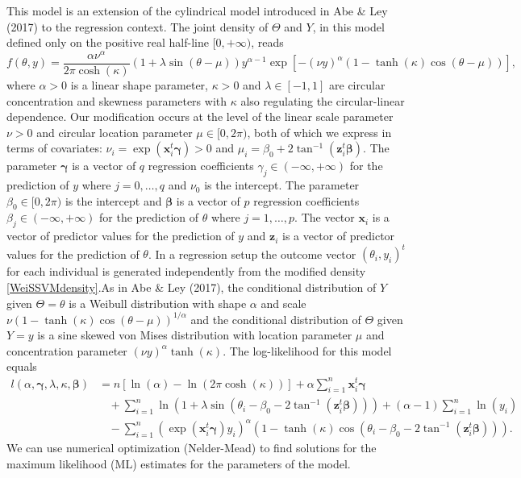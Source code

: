 \documentclass[12pt,]{article}
\begin{document}
This model is an extension of the cylindrical model introduced in Abe \&
Ley (2017) to the regression context. The joint density of \(\Theta\)
and \(Y\), in this model defined only on the positive real half-line
\([0, + \infty)\), reads \begin{equation}\label{WeiSSVMdensity}
f(\theta, y) = \frac{\alpha\nu^\alpha}{2\pi\cosh(\kappa)}
                 (1 +\lambda\sin(\theta - \mu))
                 y^{\alpha-1}
                 \exp[-(\nu y)^{\alpha}(1-\tanh(\kappa)\cos(\theta - \mu))],
\end{equation} \noindent where \(\alpha > 0\) is a linear shape
parameter, \(\kappa > 0\) and \(\lambda \in [-1, 1]\) are circular
concentration and skewness parameters with \(\kappa\) also regulating
the circular-linear dependence. Our modification occurs at the level of
the linear scale parameter \(\nu>0\) and circular location parameter
\(\mu\in [0, 2\pi)\), both of which we express in terms of covariates:
\(\nu_i = \exp(\boldsymbol{x}_i^t\boldsymbol{\gamma}) > 0\) and
\(\mu_i = \beta_0 + 2\tan^{-1}(\boldsymbol{z}_i^t\boldsymbol{\beta})\).
The parameter \(\boldsymbol{\gamma}\) is a vector of \(q\) regression
coefficients \(\gamma_j \in (-\infty, +\infty)\) for the prediction of
\(y\) where \(j = 0, \dots, q\) and \(\nu_0\) is the intercept. The
parameter \(\beta_0 \in [0, 2\pi)\) is the intercept and
\(\boldsymbol{\beta}\) is a vector of \(p\) regression coefficients
\(\beta_j \in (-\infty, +\infty)\) for the prediction of \(\theta\)
where \(j = 1, \dots, p\). The vector \(\boldsymbol{x}_i\) is a vector
of predictor values for the prediction of \(y\) and \(\boldsymbol{z}_i\)
is a vector of predictor values for the prediction of \(\theta\). In a
regression setup the outcome vector \((\theta_i, y_i)^t\) for each
individual is generated independently from the modified density
\eqref{WeiSSVMdensity}.\newline \indent As in Abe \& Ley (2017), the
conditional distribution of \(Y\) given \(\Theta=\theta\) is a Weibull
distribution with shape \(\alpha\) and scale
\(\nu(1-\tanh(\kappa)\cos(\theta - \mu))^{1/\alpha}\) and the
conditional distribution of \(\Theta\) given \(Y=y\) is a sine skewed
von Mises distribution with location parameter \(\mu\) and concentration
parameter \((\nu y)^\alpha\tanh(\kappa)\). The log-likelihood for this
model equals \begin{align}\label{WeiSSVMLikelihood}
l(\alpha, \boldsymbol{\gamma}, \lambda, \kappa, \boldsymbol{\beta}) 
   &= n[\ln(\alpha) - \ln(2\pi\cosh(\kappa))] + \alpha \sum^{n}_{i = 1} \boldsymbol{x}_i^t\boldsymbol{\gamma} \nonumber\\
   &\:\:\:\:+\sum^{n}_{i = 1} \ln(1 +\lambda\sin(\theta_i - \beta_0 - 2\tan^{-1}(\boldsymbol{z}_i^t\boldsymbol{\beta}))) 
   +(\alpha-1)\sum^{n}_{i = 1} \ln(y_i) \nonumber\\
   &\:\:\:\:-\sum^{n}_{i = 1}( \exp(\boldsymbol{x}_i^t\boldsymbol{\gamma})y_i)^{\alpha}(1-\tanh(\kappa)\cos(\theta_i - \beta_0 - 2\tan^{-1}(\boldsymbol{z}_i^t\boldsymbol{\beta}))).\nonumber
\end{align} \noindent We can use numerical optimization (Nelder-Mead) to
find solutions for the maximum likelihood (ML) estimates for the
parameters of the model.
\end{document}
